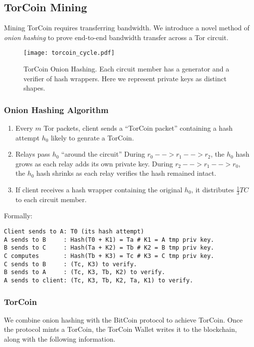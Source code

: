 \subsection{TorCoin Mining}

Mining TorCoin requires transferring bandwidth. We introduce a novel method of \textit{onion hashing} to prove end-to-end bandwidth transfer across a Tor circuit.

\begin{figure}[H]
  \centering
    \texttt{[image: torcoin\_cycle.pdf]}
  \caption{TorCoin Onion Hashing. Each circuit member has a generator and a verifier of hash wrappers. Here we represent private keys as distinct shapes.}
\end{figure}

\subsubsection{Onion Hashing Algorithm}
\begin{enumerate}
\item Every $m$ Tor packets, client sends a ``TorCoin packet'' containing a hash attempt $h_0$ likely to genrate a TorCoin.
\item Relays pass $h_0$ ``around the circuit''
\subitem During $r_0 --> r_1 --> r_2$, the $h_0$ hash grows as each relay adds its own private key.
\subitem During $r_2 --> r_1 --> r_0$, the $h_0$ hash shrinks as each relay verifies the hash remained intact.
\item If client receives a hash wrapper containing the original $h_0$, it distributes $\frac{1}{3} TC$ to each circuit member.
\end{enumerate}

Formally:

\begin{verbatim}
Client sends to A: T0 (its hash attempt)
A sends to B     : Hash(T0 + K1) = Ta # K1 = A tmp priv key.
B sends to C     : Hash(Ta + K2) = Tb # K2 = B tmp priv key.
C computes       : Hash(Tb + K3) = Tc # K3 = C tmp priv key.
C sends to B     : (Tc, K3) to verify.
B sends to A     : (Tc, K3, Tb, K2) to verify.
A sends to client: (Tc, K3, Tb, K2, Ta, K1) to verify.
\end{verbatim}

\subsubsection{TorCoin}
We combine onion hashing with the BitCoin protocol to achieve TorCoin. Once the protocol mints a TorCoin, the TorCoin Wallet writes it to the blockchain, along with the following information.

